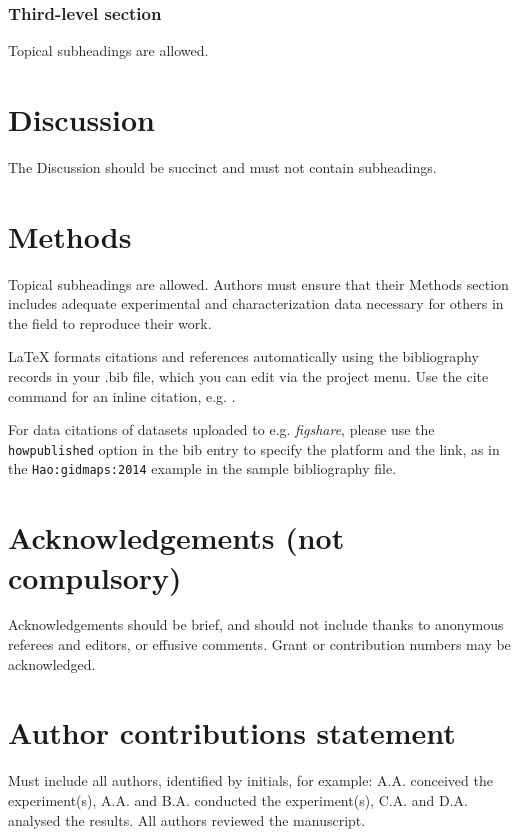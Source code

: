 \documentclass[fleqn,10pt]{wlscirep}
\begin{document}
\subsubsection*{Third-level section}
 
Topical subheadings are allowed.

\section*{Discussion}

The Discussion should be succinct and must not contain subheadings.

\section*{Methods}

Topical subheadings are allowed. Authors must ensure that their Methods section includes adequate experimental and characterization data necessary for others in the field to reproduce their work.



\noindent LaTeX formats citations and references automatically using the bibliography records in your .bib file, which you can edit via the project menu. Use the cite command for an inline citation, e.g.  \cite{Hao:gidmaps:2014}.

For data citations of datasets uploaded to e.g. \emph{figshare}, please use the \verb|howpublished| option in the bib entry to specify the platform and the link, as in the \verb|Hao:gidmaps:2014| example in the sample bibliography file.

\section*{Acknowledgements (not compulsory)}

Acknowledgements should be brief, and should not include thanks to anonymous referees and editors, or effusive comments. Grant or contribution numbers may be acknowledged.

\section*{Author contributions statement}

Must include all authors, identified by initials, for example:
A.A. conceived the experiment(s),  A.A. and B.A. conducted the experiment(s), C.A. and D.A. analysed the results.  All authors reviewed the manuscript. 
\end{document}
